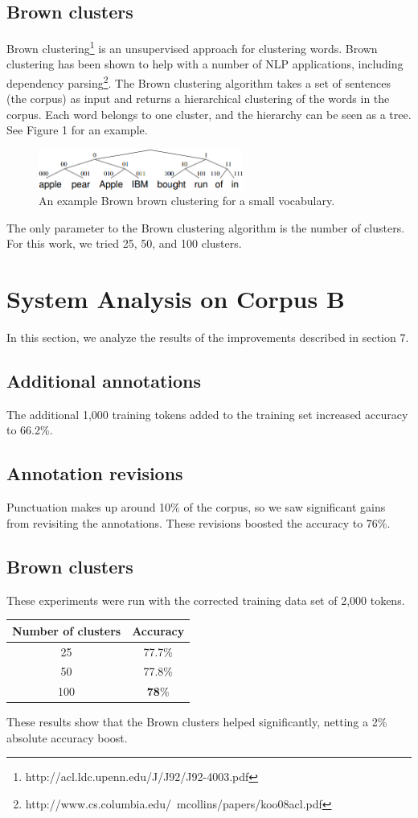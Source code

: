 \documentclass[11pt,letterpaper]{article}
\begin{document}
\subsection{Brown clusters}
Brown clustering\footnote{http://acl.ldc.upenn.edu/J/J92/J92-4003.pdf} is an unsupervised approach for clustering words. Brown clustering has been shown to help with a number of NLP applications, including dependency parsing\footnote{http://www.cs.columbia.edu/~mcollins/papers/koo08acl.pdf}. The Brown clustering algorithm takes a set of sentences (the corpus) as input and returns a hierarchical clustering of the words in the corpus. Each word belongs to one cluster, and the hierarchy can be seen as a tree. See Figure 1 for an example. \\
\begin{figure}[t!]
    \centering
    \includegraphics[width=0.6\textwidth]{images/brown_clusters.png}
    \caption{An example Brown brown clustering for a small vocabulary.}
    \label{fig:brown}
\end{figure}
The only parameter to the Brown clustering algorithm is the number of clusters. For this work, we tried 25, 50, and 100 clusters. \\

\section{System Analysis on Corpus B}
In this section, we analyze the results of the improvements described in section 7.
\subsection{Additional annotations}
The additional 1,000 training tokens added to the training set increased accuracy to 66.2\%.
\subsection{Annotation revisions}
Punctuation makes up around 10\% of the corpus, so we saw significant gains from revisiting the annotations. These revisions boosted the accuracy to 76\%. 
\subsection{Brown clusters}
These experiments were run with the corrected training data set of 2,000 tokens. 
\begin{center}
\begin{tabular}{|c|c|}
\hline
Number of clusters & Accuracy\\
\hline
25 & 77.7\%\\
50& 77.8\%\\
100 & \textbf{78}\%\\
\hline
\end{tabular}
\end{center}
These results show that the Brown clusters helped significantly, netting a 2\% absolute accuracy boost.
\end{document}
